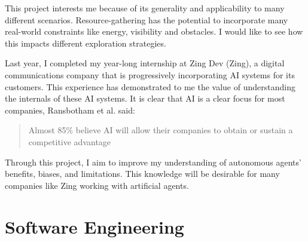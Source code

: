\documentclass[]{final_report}
\begin{document}
This project interests me because of its generality and applicability to many different scenarios. Resource-gathering has the potential to incorporate many real-world constraints like energy, visibility and obstacles. I would like to see how this impacts different exploration strategies.

Last year, I completed my year-long internship at Zing Dev (Zing), a digital communications company that is progressively incorporating AI systems for its customers. This experience has demonstrated to me the value of understanding the internals of these AI systems. It is clear that AI is a clear focus for most companies, Ransbotham et al. said: 
\begin{quote}
  Almost 85\% believe AI will allow their companies to obtain or sustain a competitive advantage \cite{ransbotham2017reshaping}
\end{quote}

Through this project, I aim to improve my understanding of autonomous agents' benefits, biases, and limitations. This knowledge will be desirable for many companies like Zing working with artificial agents.



\chapter{Software Engineering}
\end{document}
